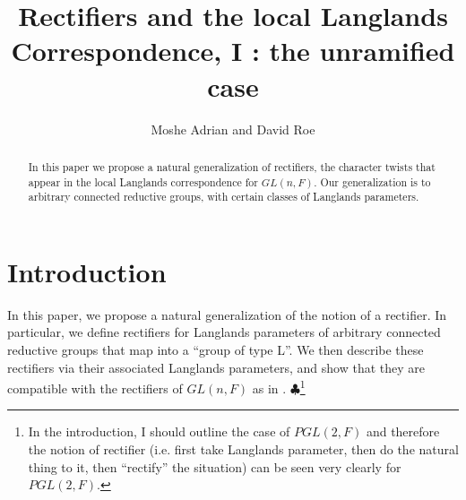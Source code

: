\documentclass[11pt]{amsart}
\theoremstyle{plain}
\newcommand{\MAxxx}[1]{$\clubsuit$\footnote{#1}}
\theoremstyle{definition}
\begin{document}
\title{Rectifiers and the local Langlands Correspondence, I : the unramified case}
\author{Moshe Adrian and David Roe}



\begin{abstract}

In this paper we propose a natural generalization of rectifiers, the
character twists that appear in the local Langlands correspondence for
$GL(n,F)$.  Our generalization is to arbitrary connected reductive
groups, with certain classes of Langlands parameters.

\end{abstract}

\maketitle

\section{Introduction}
In this paper, we propose a natural generalization of the notion of a
rectifier.  In particular, we define rectifiers for Langlands
parameters of arbitrary connected reductive groups that map into a
``group of type L''.  We then describe these rectifiers via their
associated Langlands parameters, and show that they are compatible
with the rectifiers of $GL(n,F)$ as in \cite{bushnellhenniart}.
\MAxxx{In the introduction, I should outline the case of $PGL(2,F)$
and therefore the notion of rectifier (i.e. first take Langlands
parameter, then do the natural thing to it, then ``rectify''
the situation) can be seen very clearly for $PGL(2,F)$.}
\end{document}
